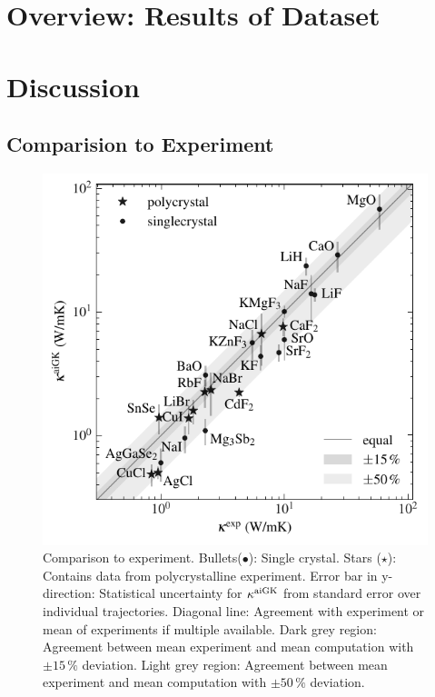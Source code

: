 \section{Overview: Results of Dataset}
\section{Discussion}
\subsection{Comparision to Experiment}

\begin{figure}
	\includegraphics[width=\textwidth]{./data/plots/kappa_vs_exp_trusted/kappa_vs_exp_corrected_annotated.pdf}
	\caption{Comparison to experiment. Bullets($\bullet$): Single crystal. Stars ($\star$): Contains data from polycrystalline experiment. Error bar in y-direction: Statistical uncertainty for $\kappa^{\rm aiGK}$ from standard error over individual trajectories. Diagonal line: Agreement with experiment or mean of experiments if multiple available. Dark grey region: Agreement between mean experiment and mean computation with $\pm 15\,\%$ deviation. Light grey region: Agreement between mean experiment and mean computation with $\pm 50\,\%$ deviation.}
	\label{fig:kappa_exp}
\end{figure}



